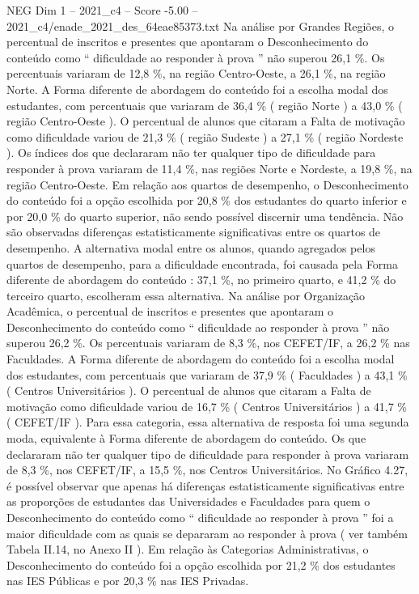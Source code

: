 \begin{textsample}{NEG Dim 1 – 2021\_c4 – Score -5.00 – 2021\_c4/enade\_2021\_des\_64eae85373.txt}
Na análise por Grandes Regiões, o percentual de inscritos e presentes que apontaram o Desconhecimento do conteúdo como “ dificuldade ao responder à prova ” não superou 26,1 \%.
Os percentuais variaram de 12,8 \%, na região Centro-Oeste, a 26,1 \%, na região Norte.
A Forma diferente de abordagem do conteúdo foi a escolha modal dos estudantes, com percentuais que variaram de 36,4 \% ( região Norte ) a 43,0 \% ( região Centro-Oeste ).
O percentual de alunos que citaram a Falta de motivação como dificuldade variou de 21,3 \% ( região Sudeste ) a 27,1 \% ( região Nordeste ).
Os índices dos que declararam não ter qualquer tipo de dificuldade para responder à prova variaram de 11,4 \%, nas regiões Norte e Nordeste, a 19,8 \%, na região Centro-Oeste.
Em relação aos quartos de desempenho, o Desconhecimento do conteúdo foi a opção escolhida por 20,8 \% dos estudantes do quarto inferior e por 20,0 \% do quarto superior, não sendo possível discernir uma tendência.
Não são observadas diferenças estatisticamente significativas entre os quartos de desempenho.
A alternativa modal entre os alunos, quando agregados pelos quartos de desempenho, para a dificuldade encontrada, foi causada pela Forma diferente de abordagem do conteúdo : 37,1 \%, no primeiro quarto, e 41,2 \% do terceiro quarto, escolheram essa alternativa.
Na análise por Organização Acadêmica, o percentual de inscritos e presentes que apontaram o Desconhecimento do conteúdo como “ dificuldade ao responder à prova ” não superou 26,2 \%.
Os percentuais variaram de 8,3 \%, nos CEFET/IF, a 26,2 \% nas Faculdades.
A Forma diferente de abordagem do conteúdo foi a escolha modal dos estudantes, com percentuais que variaram de 37,9 \% ( Faculdades ) a 43,1 \% ( Centros Universitários ).
O percentual de alunos que citaram a Falta de motivação como dificuldade variou de 16,7 \% ( Centros Universitários ) a 41,7 \% ( CEFET/IF ).
Para essa categoria, essa alternativa de resposta foi uma segunda moda, equivalente à Forma diferente de abordagem do conteúdo.
Os que declararam não ter qualquer tipo de dificuldade para responder à prova variaram de 8,3 \%, nos CEFET/IF, a 15,5 \%, nos Centros Universitários.
No Gráfico 4.27, é possível observar que apenas há diferenças estatisticamente significativas entre as proporções de estudantes das Universidades e Faculdades para quem o Desconhecimento do conteúdo como “ dificuldade ao responder à prova ” foi a maior dificuldade com as quais se depararam ao responder à prova ( ver também Tabela II.14, no Anexo II ).
Em relação às Categorias Administrativas, o Desconhecimento do conteúdo foi a opção escolhida por 21,2 \% dos estudantes nas IES Públicas e por 20,3 \% nas IES Privadas.

\end{textsample}
